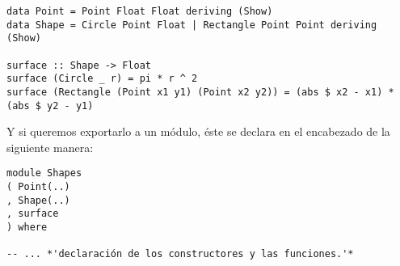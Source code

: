 \begin{lstlisting}
data Point = Point Float Float deriving (Show)
data Shape = Circle Point Float | Rectangle Point Point deriving (Show)

surface :: Shape -> Float
surface (Circle _ r) = pi * r ^ 2
surface (Rectangle (Point x1 y1) (Point x2 y2)) = (abs $ x2 - x1) * (abs $ y2 - y1)
\end{lstlisting}

Y si queremos exportarlo a un módulo, éste se declara en el encabezado de la siguiente manera:

\begin{lstlisting}
module Shapes
( Point(..)
, Shape(..)
, surface
) where

-- ... *'declaración de los constructores y las funciones.'*
\end{lstlisting}


